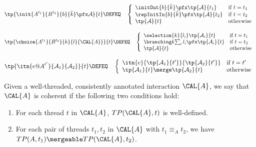 {\small
\[
\tp{\init {A^{t_1}}{B^{t_2}}{b}{\tilde k}\pfx\mathcal A}{t}
    \DEFEQ
  \quad  \left\{ 
      \begin{array}{ll}
        \initOut{b}{\tilde k}\pfx\tp{\mathcal A}{t_1}
        &         
        \textrm{if}\ t=t_1\\
        \repInitIn{b}{\tilde k}\pfx\tp{\mathcal A}{t_2}
        & 
        \textrm{if}\ t=t_2\\
        \tp{\mathcal A}{t}
        & 
        \text{otherwise}
      \end{array}
    \right.
\]

\[\tp{\choice {A^{t_1}}{B^{t_2}}{k}{l}{\CAL{A}}}{t}
    \DEFEQ
    \quad\left\{ 
      \begin{array}{ll}
        \selection {k} {l_i}\tp{\mathcal A_i}{t}
       &                 \textrm{if}\ t=t_1
\\
        \branching k {\sum_i l_i}\pfx\tp{\mathcal A_i}{t}
        & 
        \textrm{if}\ t=t_2\\
        \tp{\mathcal A}{t}
        & 
        \text{otherwise}
      \end{array}
    \right.
\]

\[ \tp{\itn{e@A^{t'}}{\mathcal A_1}{\mathcal A_2}}{t}
    \DEFEQ
   \quad    \left\{ 
      \begin{array}{ll}
        \itn{e}{\tp{\mathcal A_1}{t'}}{\tp{\mathcal A_2}{t'}}
        &         
        \textrm{if}\ t=t'\\
        \tp{\mathcal A_1}{t}\merge\tp{\mathcal A_2}{t}
        & 
        \text{otherwise}
      \end{array}
    \right.
\]
}









\begin{definition}
  Given a well-threaded, consistently annotated interaction $\CAL{A}$,
  we say that $\CAL{A}$ is coherent if the following two conditions
  hold:
  \begin{enumerate}
    \item For each thread $t$ in $\CAL{A}$, $TP(\CAL{A},t)$ is
      well-defined. 
    \item For each pair of threads $t_1,t_2$ in $\CAL{A}$ with
        $t_1 \equiv_A t_2$, we have $TP(A,t_1) \mergeable
        TP(\CAL{A}, t_2)$. 
      \end{enumerate}
\end{definition}

